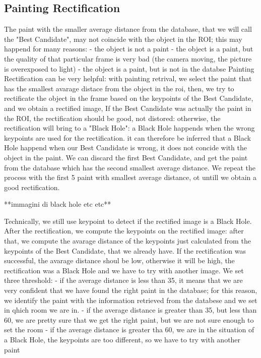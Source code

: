 \documentclass[10pt,twocolumn,letterpaper]{article}
\begin{document}
\subsection{Painting Rectification}
The paint with the smaller average distance from the database, that we will call the "Best Candidate", may not coincide with the object in the ROI; this may happend for many reasons:
	- the object is not a paint
	- the object is a paint, but the quality of that particular frame is very bad (the camera moving, the picture is overexposed to light)
	- the object is a paint, but is not in the databse
Painting Rectification can be very helpful: with painting retrival, we select the paint that has the smallest avarage distace from the object in the roi, then, we try to rectificate the object in the frame based on the keypoints of the Best Candidate, and we obtain a rectified image,
If the Best Candidate was actually the paint in the ROI, the rectification should be good, not distored: otherwise, the rectification will bring to a "Black Hole": a Black Hole happends when the wrong keypoints are used for the rectification.
it can therefore be inferred that a Black Hole happend when our Best Candidate is wrong, it does not concide with the object in the paint.
We can discard the first Best Candidate, and get the paint from the database which has the second smallest average distance.
We repeat the process with the first 5 paint with smallest average distance, ot untill we obtain a good rectification.

**immagini di black hole etc etc**

Technically, we still use keypoint to detect if the rectified image is a Black Hole. After the rectification, we compute the keypoints on the rectified image: after that, we compute the avarage distance of the keypoints just calculated from the keypoints of the Best Candidate, that we already have. If the rectification was successful, the avarage distance shoul be low, otherwise it will be high, the rectification was a Black Hole and we have to try with another image.
We set three threshold:
	- if the average distance is less than 35, it means that we are very confident that we have found the right paint in the database; for this reason, we identify the paint with the information retrieved from the databese and we set in qhich room we are in.
	- if the average distance is greater than 35, but less than 60, we are pretty sure that we get the right paint, but we are not sure enough to set the room
	- if the average distance is greater tha 60, we are in the situation of a Black Hole, the keypoints are too different, so we have to try with another paint 
\end{document}
